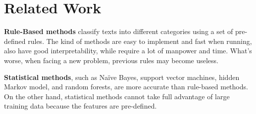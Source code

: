 \documentclass{amsart}
\begin{document}














\section{Related Work} \label{sec-relatedwork}

\textbf{Rule-Based methods} classify texts into different categories using a set of pre-defined rules. The kind of methods are easy to implement and fast when running, also have good interpretability, while require a lot of manpower and time. What's worse, when facing a new problem, previous rules may become useless.

\textbf{Statistical methods}, such as Naïve Bayes, support vector machines, hidden Markov model, and random forests, are more accurate than rule-based methods. On the other hand, statistical methods cannot take full advantage of large training data because the features are pre-defined.
\end{document}
